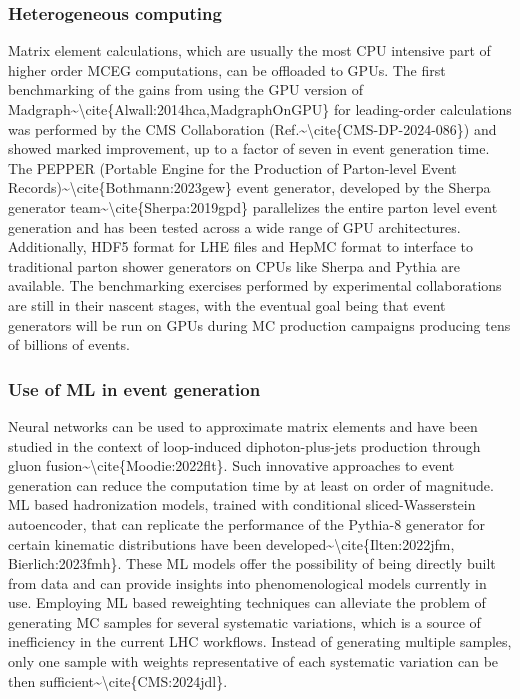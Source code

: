 \subsubsection{Heterogeneous computing}\label{heterogeneous-computing}

Matrix element calculations, which are usually the most CPU intensive
part of higher order MCEG computations, can be offloaded to GPUs. The
first benchmarking of the gains from using the GPU version of
Madgraph\textasciitilde\textbackslash cite\{Alwall:2014hca,MadgraphOnGPU\}
for leading-order calculations was performed by the CMS Collaboration
(Ref.\textasciitilde\textbackslash cite\{CMS-DP-2024-086\}) and showed
marked improvement, up to a factor of seven in event generation time.
The PEPPER (Portable Engine for the Production of Parton-level Event
Records)\textasciitilde\textbackslash cite\{Bothmann:2023gew\} event
generator, developed by the Sherpa generator
team\textasciitilde\textbackslash cite\{Sherpa:2019gpd\} parallelizes
the entire parton level event generation and has been tested across a
wide range of GPU architectures. Additionally, HDF5 format for LHE files
and HepMC format to interface to traditional parton shower generators on
CPUs like Sherpa and Pythia are available. The benchmarking exercises
performed by experimental collaborations are still in their nascent
stages, with the eventual goal being that event generators will be run
on GPUs during MC production campaigns producing tens of billions of
events.

\subsubsection{\texorpdfstring{Use of ML in event generation
}{Use of ML in event generation }}\label{use-of-ml-in-event-generation}

Neural networks can be used to approximate matrix elements and have been
studied in the context of loop-induced diphoton-plus-jets production
through gluon
fusion\textasciitilde\textbackslash cite\{Moodie:2022flt\}. Such
innovative approaches to event generation can reduce the computation
time by at least on order of magnitude. ML based hadronization models,
trained with conditional sliced-Wasserstein autoencoder, that can
replicate the performance of the Pythia-8 generator for certain
kinematic distributions have been
developed\textasciitilde\textbackslash cite\{Ilten:2022jfm,
Bierlich:2023fmh\}. These ML models offer the possibility of being
directly built from data and can provide insights into phenomenological
models currently in use. Employing ML based reweighting techniques can
alleviate the problem of generating MC samples for several systematic
variations, which is a source of inefficiency in the current LHC
workflows. Instead of generating multiple samples, only one sample with
weights representative of each systematic variation can be then
sufficient\textasciitilde\textbackslash cite\{CMS:2024jdl\}.

